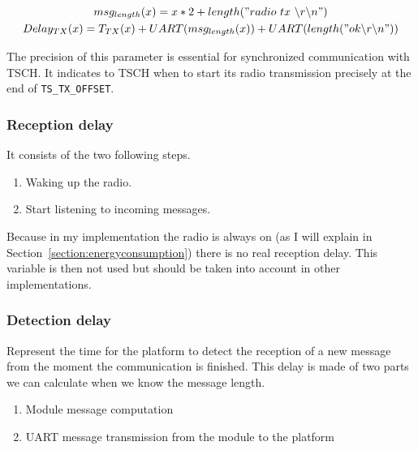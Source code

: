 \begin{gather}
  \label{eq:transmissiondelay}
  msg_{length}(x) = x * 2 + length("radio~tx~\backslash r \backslash n") \\
  Delay_{TX}(x) = T_{TX}(x) + UART(msg_{length}(x)) + UART(length("ok \backslash r\backslash n"))
\end{gather}

The precision of this parameter is essential for synchronized communication
with TSCH.
It indicates to TSCH when to start its radio transmission precisely at the
end of \lstinline{TS_TX_OFFSET}.

\subsubsection{Reception delay}

It consists of the two following steps.

\begin{enumerate}
  \item Waking up the radio.
  \item Start listening to incoming messages.
\end{enumerate}

Because in my implementation the radio is always on (as I will explain in
Section~\ref{section:energyconsumption}) there is no real reception
delay.
This variable is then not used but should be taken into account in other
implementations.

\subsubsection{Detection delay\label{section:detectiondelay}}


Represent the time for the platform to detect the reception of a new message
from the moment the communication is finished.
This delay is made of two parts we can calculate when we know the message
length.

\begin{enumerate}
  \item Module message computation
  \item UART message transmission from the module to the platform
\end{enumerate}


